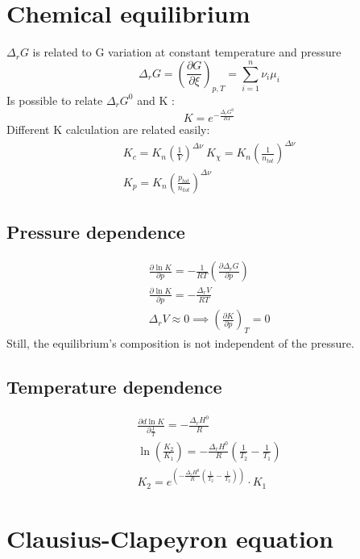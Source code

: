 \documentclass[Master.tex]{subfiles}
\begin{document}
\begin{multicols}{2}
				  \section{Chemical equilibrium}
				   \( \Delta _{r}G  \) is related to G variation at constant temperature and pressure
				   \[
				   \Delta_{r} G =  \left(  \frac{\partial G}{\partial \xi} \right)_{p,T} = \sum_{i=1}^{n} \nu _{i} \mu _{i}
				  \]
				  Is possible to relate \( \Delta _{r}G^{0} \) and K :
				  \[
						   K = e ^{-\frac{\Delta _{r}G^{0}  }{RT}}
				  \]
				  Different K calculation are related easily:
				  \begin{gather*}
						   K_{c} = K_{n} \left (\frac{1}{V} \right)^{\Delta \nu}  ~ K_{\chi } = K_{n} \left(\frac{1}{n_{tot} }\right)^{\Delta \nu } \\
						   K_{p} = K_{n} \left(\frac{p_{tot}}{n_{tot}}\right) ^{\Delta \nu} \quad
				  \end{gather*}
				  \subsection{Pressure dependence}
						   \begin{gather*}
								    \frac{\partial \ln K}{\partial p} = - \frac{1}{RT} \left( \frac{\partial \Delta_{r} G}{\partial p} \right) \\ \frac{\partial \ln K}{\partial p} = - \frac{\Delta _{r}V }{RT} \\ \Delta _{r} V \approx 0 \implies \left(
										     \frac{\partial K}{\partial p} \right)_{T} = 0
						   \end{gather*}
						   Still, the equilibrium's composition is not independent of the pressure.
				  \subsection{Temperature dependence}
						   \begin{gather*}
								    \frac{\partial d\ln K}{\partial \frac{1}{T}} = - \frac{\Delta_{r}H^{0}}{R}\\ \ln \left( \frac{K_2}{K_1}
										     \right) = - \frac{\Delta_{r}H^{0}}{R}\left(\frac{1}{T_2} - \frac{1}{T_1}
										     \right)\\ K_2 = e^{\left( - \frac{\Delta_{r}H^{0} }{R}(\frac{1}{T_2} -
										     \frac{1}{T_2}) \right) } \cdot K_1
						   \end{gather*}

				  \section{Clausius-Clapeyron equation}


\end{multicols}
\end{document}
